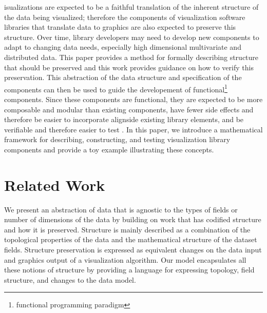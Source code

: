 \documentclass[10pt,journal,compsoc]{IEEEtran}
\theoremstyle{definition}
\theoremstyle{remark}
\begin{document}
isualizations are expected to be a faithful translation of the inherent structure of the data being visualized; therefore the components of visualization software libraries that translate data to graphics are also expected to preserve this structure. Over time, library developers may need to develop new components to adapt to changing data needs, especially high dimensional multivariate and distributed data. 
This paper provides a method for formally describing structure that should be preserved and this work provides guidance on how to verify this preservation. This abstraction of the data structure and specification of the components can then be used to guide the developement of functional\footnote{functional programming paradigm} components. Since these components are functional, they are expected to be more composable and modular than existing components, have fewer side effects and therefore be easier to incorporate alignside existing library elements, and be verifiable and therefore easier to test \cite{huHowFunctionalProgramming2015,hughesWhyFunctionalProgramming1989}. In this paper, we introduce a mathematical framework for describing, constructing, and testing visualization library components and provide a toy example illustrating these concepts.

\section{Related Work}
We present an abstraction of data that is agnostic to the types of fields or number of dimensions of the data by building on work that has codified structure and how it is preserved. Structure is mainly described as a combination of the topological properties of the data and the mathematical structure of the dataset fields. Structure preservation is expressed as equivalent changes on the data input and graphics output of a visualization algorithm. Our model encapsulates all these notions of structure by providing a language for expressing topology, field structure, and changes to the data model.  
\end{document}
